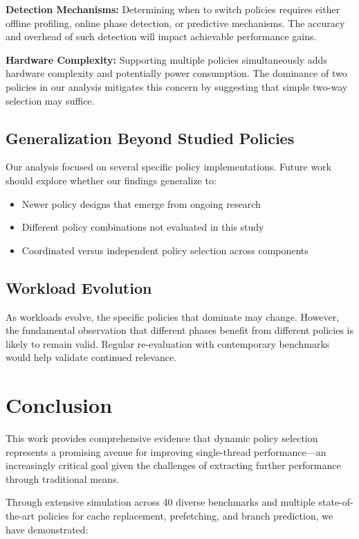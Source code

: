\documentclass[conference]{IEEEtran}
\begin{document}
\textbf{Detection Mechanisms:} Determining when to switch policies requires either offline profiling, online phase detection, or predictive mechanisms. The accuracy and overhead of such detection will impact achievable performance gains.

\textbf{Hardware Complexity:} Supporting multiple policies simultaneously adds hardware complexity and potentially power consumption. The dominance of two policies in our analysis mitigates this concern by suggesting that simple two-way selection may suffice.

\subsection{Generalization Beyond Studied Policies}

Our analysis focused on several specific policy implementations. Future work should explore whether our findings generalize to:

\begin{itemize}
\item Newer policy designs that emerge from ongoing research
\item Different policy combinations not evaluated in this study
\item Coordinated versus independent policy selection across components
\end{itemize}

\subsection{Workload Evolution}

As workloads evolve, the specific policies that dominate may change. However, the fundamental observation that different phases benefit from different policies is likely to remain valid. Regular re-evaluation with contemporary benchmarks would help validate continued relevance.

\section{Conclusion}

This work provides comprehensive evidence that dynamic policy selection represents a promising avenue for improving single-thread performance---an increasingly critical goal given the challenges of extracting further performance through traditional means.

Through extensive simulation across 40 diverse benchmarks and multiple state-of-the-art policies for cache replacement, prefetching, and branch prediction, we have demonstrated:
\end{document}
